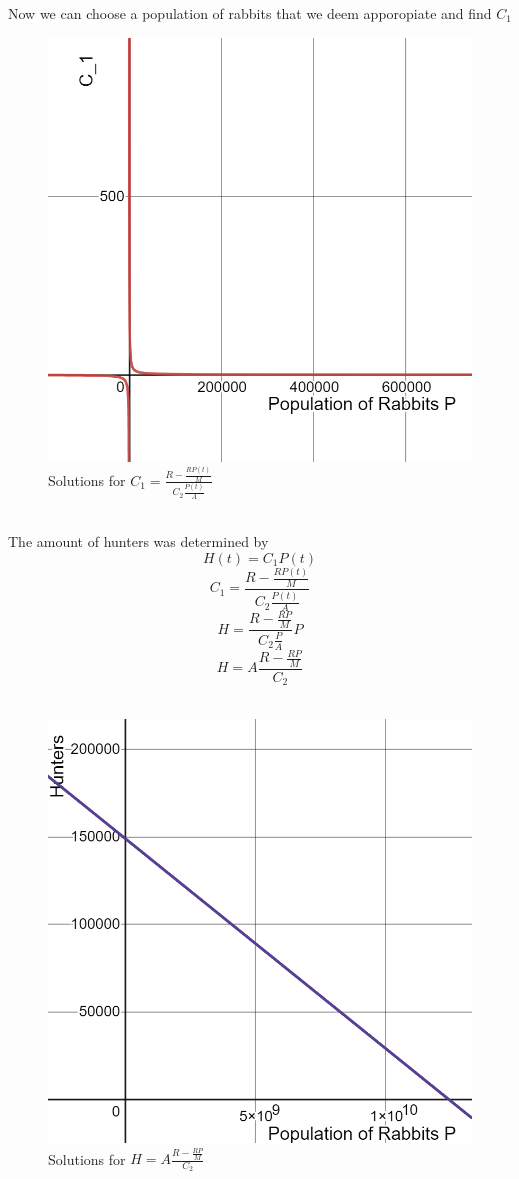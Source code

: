 \documentclass{article}
\begin{document}
Now we can choose a population of rabbits that we deem apporopiate and find $C_1$
\begin{figure}[h!]
	\centering
	\includegraphics[scale=0.3]{Pictures/C_1-P}
	\caption{Solutions for $C_1 = \frac{R-\frac{RP(t)}{M}}{C_2 \frac{P(t)}{A}} $ }
	\label{fig:C_1-P}
\end{figure}
\\
The amount of hunters was determined by 
$$H(t) = C_1 P(t)$$
$$ C_1 = \frac{R-\frac{RP(t)}{M}}{C_2 \frac{P(t)}{A}} $$
$$H=\frac{R-\frac{RP}{M}}{C_2 \frac{P}{A}}P$$
$$H = A\frac{R-\frac{RP}{M}}{C_2}$$
\\
\begin{figure}[h!]
	\centering
	\includegraphics[scale=0.3]{Pictures/H-P}
	\caption{Solutions for $H = A\frac{R-\frac{RP}{M}}{C_2}$ }
	\label{fig:H-P}
\end{figure}
\end{document}
